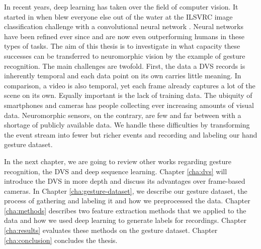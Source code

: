 In recent years, deep learning has taken over the field of computer vision. It
started in \citeyear{alexnet} when \citeauthor{alexnet} blew everyone else out
of the water at the ILSVRC image classification challenge with a convolutional
neural network \cite{alexnet}. Neural networks have been refined ever since and
are now even outperforming humans in these types of tasks. The aim of this
thesis is to investigate in what capacity these successes can be transferred to
neuromorphic vision by the example of gesture recognition. The main challenges
are twofold. First, the data a DVS records is inherently temporal and each data
point on its own carries little meaning. In comparison, a video is also
temporal, yet each frame already captures a lot of the scene on its own. Equally
important is the lack of training data. The ubiquity of smartphones and cameras
has people collecting ever increasing amounts of visual data. Neuromorphic
sensors, on the contrary, are few and far between with a shortage of publicly
available data. We handle these difficulties by transforming the event stream
into fewer but richer events and recording and labeling our hand gesture
dataset.

In the next chapter, we are going to review other works regarding gesture
recognition, the DVS and deep sequence learning. Chapter \ref{cha:dvs} will
introduce the DVS in more depth and discuss its advantages over frame-based
cameras. In Chapter \ref{cha:gesture-dataset}, we describe our gesture dataset,
the process of gathering and labeling it and how we preprocessed the data.
Chapter \ref{cha:methods} describes two feature extraction methods that we
applied to the data and how we used deep learning to generate labels for
recordings. Chapter \ref{cha:results} evaluates these methods on the gesture
dataset. Chapter \ref{cha:conclusion} concludes the thesis.
